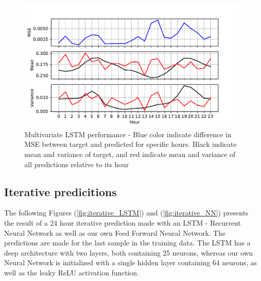 \documentclass
[twocolumn,
secnumarabic,
nobibnotes,
aps,
prl,
reprint,
groupedaddress,
amsmath,
amssymb,
]{revtex4-2}
\begin{document}
\begin{figure}
  \includegraphics[width=\columnwidth]{figures/multivariate_hourly_stats_LSTM.pdf}
  \caption{\label{fig:multivariate_hourly_stats_LSTM} Multivariate LSTM performance - Blue color indicate difference in MSE between target and predicted for specific hours. Black indicate mean and variance of target, and red indicate mean and variance of all predictions relative to its hour}
\end{figure}

\subsection{Iterative predicitions}
The following Figures (\ref{fig:iterative_LSTM}) and (\ref{fig:iterative_NN}) presents the result of a 24 hour iterative prediction made with an LSTM - Recurrent Neural Network as well as our own Feed Forward Neural Network. The predictions are made for the last sample in the training data. The LSTM has a deep architecture with two layers, both containing 25 neurons, whereas our own Neural Network is initialized with a single hidden layer containing 64 neurons, as well as the leaky ReLU activation function. 
 
\end{document}
